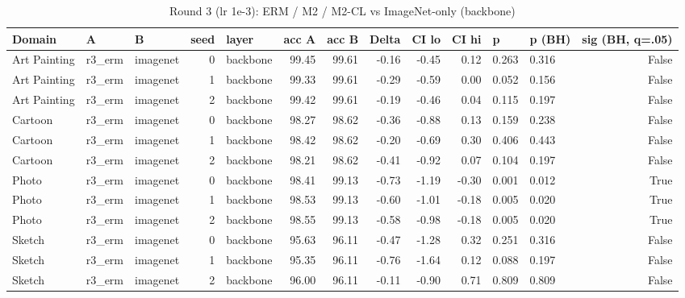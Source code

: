 \begin{table}
\caption{Round 3 (lr 1e-3): ERM / M2 / M2-CL vs ImageNet-only (backbone)}
\label{tab:leak_r3_vs_imagenet}
\begin{tabular}{lllrlrrrrrllr}
\toprule
Domain & A & B & seed & layer & acc A & acc B & Delta & CI lo & CI hi & p & p (BH) & sig (BH, q=.05) \\
\midrule
Art Painting & r3\_erm & imagenet & 0 & backbone & 99.45 & 99.61 & -0.16 & -0.45 & 0.12 & 0.263 & 0.316 & False \\
Art Painting & r3\_erm & imagenet & 1 & backbone & 99.33 & 99.61 & -0.29 & -0.59 & 0.00 & 0.052 & 0.156 & False \\
Art Painting & r3\_erm & imagenet & 2 & backbone & 99.42 & 99.61 & -0.19 & -0.46 & 0.04 & 0.115 & 0.197 & False \\
Cartoon & r3\_erm & imagenet & 0 & backbone & 98.27 & 98.62 & -0.36 & -0.88 & 0.13 & 0.159 & 0.238 & False \\
Cartoon & r3\_erm & imagenet & 1 & backbone & 98.42 & 98.62 & -0.20 & -0.69 & 0.30 & 0.406 & 0.443 & False \\
Cartoon & r3\_erm & imagenet & 2 & backbone & 98.21 & 98.62 & -0.41 & -0.92 & 0.07 & 0.104 & 0.197 & False \\
Photo & r3\_erm & imagenet & 0 & backbone & 98.41 & 99.13 & -0.73 & -1.19 & -0.30 & 0.001 & 0.012 & True \\
Photo & r3\_erm & imagenet & 1 & backbone & 98.53 & 99.13 & -0.60 & -1.01 & -0.18 & 0.005 & 0.020 & True \\
Photo & r3\_erm & imagenet & 2 & backbone & 98.55 & 99.13 & -0.58 & -0.98 & -0.18 & 0.005 & 0.020 & True \\
Sketch & r3\_erm & imagenet & 0 & backbone & 95.63 & 96.11 & -0.47 & -1.28 & 0.32 & 0.251 & 0.316 & False \\
Sketch & r3\_erm & imagenet & 1 & backbone & 95.35 & 96.11 & -0.76 & -1.64 & 0.12 & 0.088 & 0.197 & False \\
Sketch & r3\_erm & imagenet & 2 & backbone & 96.00 & 96.11 & -0.11 & -0.90 & 0.71 & 0.809 & 0.809 & False \\
\bottomrule
\end{tabular}
\end{table}
